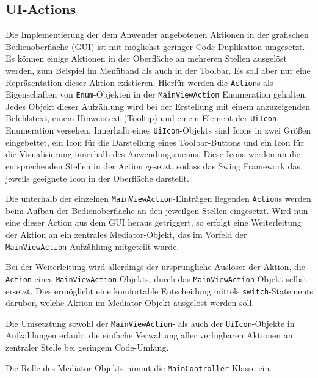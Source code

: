 \subsection{UI-Actions}
Die Implementierung der dem Anwender angebotenen Aktionen in der grafischen
Bedienoberfläche (GUI) ist mit möglichst geringer Code-Duplikation umgesetzt. Es
können einige Aktionen in der Oberfläche an mehreren Stellen ausgelöst werden,
zum Beispiel im Menüband als auch in der Toolbar. Es soll aber nur eine
Repräsentation dieser Aktion existieren. Hierfür werden die \texttt{Action}s als
Eigenschaften von \texttt{Enum}-Objekten in der \texttt{MainViewAction}
Enumeration gehalten. Jedes Objekt dieser Aufzählung wird bei der Erstellung mit
einem anzuzeigenden Befehlstext, einem Hinweistext (Tooltip) und einem Element
der \texttt{UiIcon}-Enumeration versehen. Innerhalb eines
\texttt{UiIcon}-Objekts sind Icons in zwei Größen eingebettet, ein Icon für die
Darstellung eines Toolbar-Buttons und ein Icon für die Visualisierung innerhalb
des Anwendungsmenüs. Diese Icons werden an die entsprechenden Stellen in der
Action gesetzt, sodass das Swing Framework das jeweils geeignete Icon in der
Oberfläche darstellt.

Die unterhalb der einzelnen \texttt{MainViewAction}-Einträgen liegenden
\texttt{Action}s werden beim Aufbau der Bedienoberfläche an den jeweilgen
Stellen eingesetzt. Wird nun eine dieser Action aus dem GUI heraus getriggert,
so erfolgt eine Weiterleitung der Aktion an ein zentrales Mediator-Objekt, das
im Vorfeld der \texttt{MainViewAction}-Aufzählung mitgeteilt wurde.

Bei der Weiterleitung wird allerdings der ursprüngliche Auslöser der Aktion, die
\texttt{Action} eines \texttt{MainViewAction}-Objekts, durch das
\texttt{MainViewAction}-Objekt selbst ersetzt. Dies ermöglicht eine komfortable
Entscheidung mittels \texttt{switch}-Statements darüber, welche Aktion im
Mediator-Objekt ausgelöst werden soll.

Die Umsetztung sowohl der \texttt{MainViewAction}- als auch der
\texttt{UiIcon}-Objekte in Aufzählungen erlaubt die einfache Verwaltung aller
verfügbaren Aktionen an zentraler Stelle bei geringem Code-Umfang.

Die Rolle des Mediator-Objekts nimmt die \texttt{MainController}-Klasse ein.